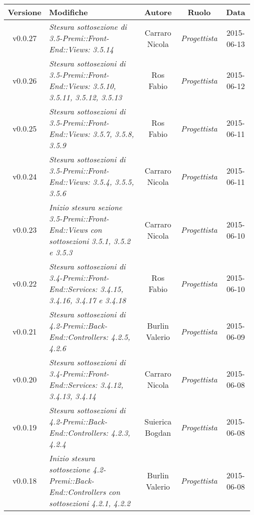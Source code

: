 \newpage

\begin{table}[h]
	\centering
	\begin{tabular}{|c|p{}|c|c|c|}
		\toprule
			\textbf{Versione} & \textbf{Modifiche} & \textbf{Autore} & \textbf{Ruolo} & \textbf{Data}\\
		\midrule
		\midrule
			v0.0.27 & \textit{Stesura sottosezione di 3.5-Premi::Front-End::Views: 3.5.14} & Carraro Nicola & \textit{Progettista} & 2015-06-13\\
		\midrule
			v0.0.26 & \textit{Stesura sottosezioni di 3.5-Premi::Front-End::Views: 3.5.10, 3.5.11, 3.5.12, 3.5.13} & Ros Fabio & \textit{Progettista} & 2015-06-12\\
		\midrule
			v0.0.25 & \textit{Stesura sottosezioni di 3.5-Premi::Front-End::Views: 3.5.7, 3.5.8, 3.5.9} & Ros Fabio & \textit{Progettista} & 2015-06-11\\
		\midrule
			v0.0.24 & \textit{Stesura sottosezioni di 3.5-Premi::Front-End::Views: 3.5.4, 3.5.5, 3.5.6} & Carraro Nicola & \textit{Progettista} & 2015-06-11\\
		\midrule
			v0.0.23 & \textit{Inizio stesura sezione 3.5-Premi::Front-End::Views con sottosezioni 3.5.1, 3.5.2 e 3.5.3} & Carraro Nicola & \textit{Progettista} & 2015-06-10\\
		\midrule
			v0.0.22 & \textit{Stesura sottosezioni di 3.4-Premi::Front-End::Services: 3.4.15, 3.4.16, 3.4.17 e 3.4.18} & Ros Fabio & \textit{Progettista} & 2015-06-10\\
		\midrule
			v0.0.21 & \textit{Stesura sottosezioni di 4.2-Premi::Back-End::Controllers: 4.2.5, 4.2.6} & Burlin Valerio & \textit{Progettista} & 2015-06-09\\
		\midrule
			v0.0.20 & \textit{Stesura sottosezioni di 3.4-Premi::Front-End::Services: 3.4.12, 3.4.13, 3.4.14} & Carraro Nicola & \textit{Progettista} & 2015-06-08\\
		\midrule
			v0.0.19 & \textit{Stesura sottosezioni di 4.2-Premi::Back-End::Controllers: 4.2.3, 4.2.4} & Suierica Bogdan & \textit{Progettista} & 2015-06-08\\
		\midrule
			v0.0.18 & \textit{Inizio stesura sottosezione 4.2-Premi::Back-End::Controllers con sottosezioni 4.2.1, 4.2.2} & Burlin Valerio & \textit{Progettista} & 2015-06-08\\	
		\bottomrule
\end{tabular}
\end{table}

\newpage

